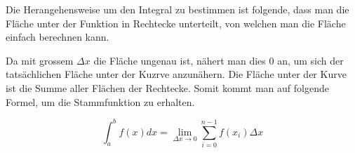 \documentclass[a4paper,11pt]{report}
\begin{document}
\begin{minipage}{.5\textwidth}
    Die Herangehensweise um den Integral zu bestimmen ist folgende, dass man die Fläche unter der Funktion in Rechtecke unterteilt, von welchen man die Fläche einfach berechnen kann.

    Da mit grossem $\Delta x$ die Fläche ungenau ist, nähert man dies 0 an, um sich der tatsächlichen Fläche unter der Kuzrve anzunähern.
    Die Fläche unter der Kurve ist die Summe aller Flächen der Rechtecke. Somit kommt man auf folgende Formel, um die Stammfunktion zu erhalten.

    $$\int_{a}^{b} f(x)dx = \lim_{\Delta x \to 0} \sum_{i=0}^{n-1} f(x_i) \Delta x$$
\end{minipage}
\begin{minipage}{.5\textwidth}
    \begin{center}
    \end{center}
\end{minipage}

\vspace{.5cm}
\end{document}
